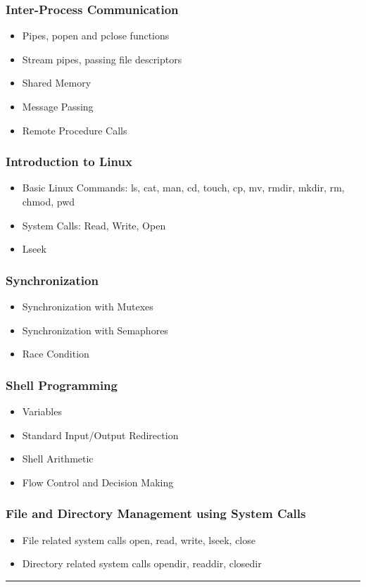 \documentclass{article}
\begin{document}
\begin{multicols*}{2}
    \subsubsection*{Inter-Process Communication}
    \begin{itemize}
        \item Pipes, popen and pclose functions
        \item Stream pipes, passing file descriptors
        \item Shared Memory
        \item Message Passing
        \item Remote Procedure Calls
    \end{itemize}
    \subsubsection*{Introduction to Linux}
    \begin{itemize}
        \item Basic Linux Commands: ls, cat, man, cd, touch, cp, mv, rmdir, mkdir, rm, chmod, pwd
        \item System Calls: Read, Write, Open
        \item Lseek
    \end{itemize}
    \subsubsection*{Synchronization}
    \begin{itemize}
        \item Synchronization with Mutexes
        \item Synchronization with Semaphores
        \item Race Condition
    \end{itemize}
    \subsubsection*{Shell Programming}
    \begin{itemize}
        \item Variables
        \item Standard Input/Output Redirection
        \item Shell Arithmetic
        \item Flow Control and Decision Making
    \end{itemize}
    \subsubsection*{File and Directory Management using System Calls}
    \begin{itemize}
        \item File related system calls open, read, write, lseek, close
        \item Directory related system calls opendir, readdir, closedir
    \end{itemize}
    \hrule

\end{multicols*}
\end{document}
